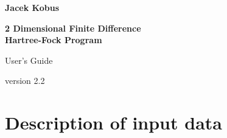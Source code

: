 \documentclass[12pt,a4paper]{article}
\newcommand{\clearemptydoublepage}{\newpage{\pagestyle{empty}\cleardoublepage}}
\begin{document}
\thispagestyle{empty} 
\begin{center}

{\Large\bf Jacek Kobus\\[20pt]}
 
{\LARGE\bf 2 Dimensional Finite Difference \\[10pt]
Hartree-Fock Program}

\vskip 1cm

{\Large User's Guide} 

\vskip 0.5cm

{\large version 2.2 }
\end{center}

\clearemptydoublepage
\tableofcontents
\thispagestyle{empty} 
\clearemptydoublepage



\section{Description of input data}
\end{document}

